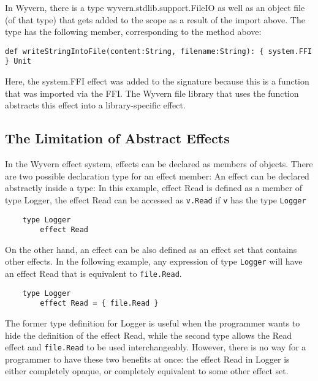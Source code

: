 In Wyvern, there is a type wyvern.stdlib.support.FileIO as well as an object file (of that type) that gets added to the scope as a result of the import above. The type has the following member, corresponding to the method above: \\
\begin{minipage}{\linewidth}
\begin{lstlisting}[xleftmargin=-5pt, numbers=none]
  def writeStringIntoFile(content:String, filename:String): { system.FFI } Unit 
\end{lstlisting}
\end{minipage}

Here, the system.FFI effect was added to the signature because this is a function that was imported via the FFI. The Wyvern file library that uses the  function abstracts this  effect into a library-specific  effect.


\subsection{The Limitation of  Abstract Effects}

In the Wyvern effect system, effects can be declared as members of objects. There are two possible declaration type for an effect member: An effect can be declared abstractly inside a type: In this example, effect Read is defined as a member of type Logger, the effect Read can be accessed as \texttt{v.Read} if \texttt{v} has the type \texttt{Logger}
\begin{verbatim}
    type Logger
        effect Read
\end{verbatim}
On the other hand, an effect can be also defined as an effect set that contains other effects. In the following example, any expression of type \texttt{Logger} will have an effect Read that is equivalent to \texttt{file.Read}.
\begin{verbatim}
    type Logger
        effect Read = { file.Read }
\end{verbatim}
The former type definition for Logger is useful when the programmer wants to hide the definition of the effect Read, while the second type allows the Read effect and \texttt{file.Read} to be used interchangeably. However, there is no way for a programmer to have these two benefits at once: the effect Read in Logger is either completely opaque, or completely equivalent to some other effect set.





